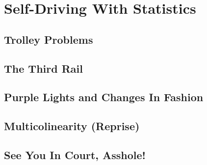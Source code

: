 \setchapterpreamble[u]{\margintoc}
\chapter{Self-Driving With Statistics}


\section{Trolley Problems}

\section{The Third Rail}

\section{Purple Lights and Changes In Fashion}

\section{Multicolinearity (Reprise)}

\section{See You In Court, Asshole!}

